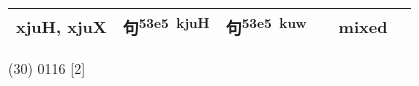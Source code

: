 \documentclass[14pt,a4paper]{scrartcl}
\begin{document}
\begin{longtable}[c]{@{}llllll@{}}
\begin{minipage}[t]{0.14\columnwidth}
xjuH, xjuX
\strut\end{minipage} &
\begin{minipage}[t]{0.14\columnwidth}\raggedright\strut
句\textsuperscript{53e5~kjuH}
\strut\end{minipage} &
\begin{minipage}[t]{0.14\columnwidth}\raggedright\strut
句\textsuperscript{53e5~kuw}
\strut\end{minipage} &
\begin{minipage}[t]{0.14\columnwidth}\raggedright\strut
\strut\end{minipage} &
\begin{minipage}[t]{0.14\columnwidth}\raggedright\strut
mixed
\strut\end{minipage}\tabularnewline
\bottomrule
\end{longtable}

(30) 0116 {[}2{]}
\end{document}
